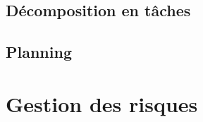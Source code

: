\documentclass{report}
\begin{document}
\section{D\'{e}composition en t\^{a}ches}

\section{Planning}


\chapter{Gestion des risques}


\end{document}
